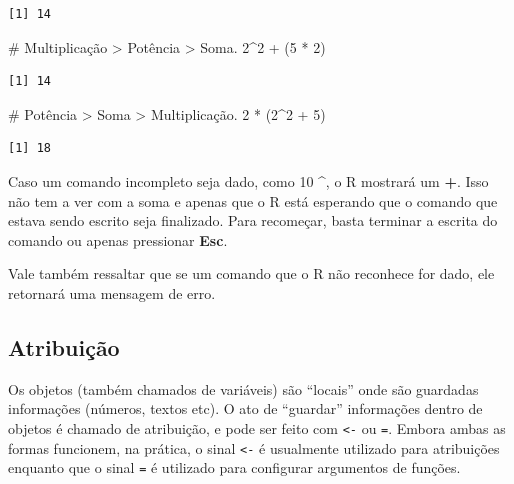 \documentclass[
  letterpaper,
  DIV=11,
  numbers=noendperiod]{scrreprt}
\newenvironment{Shaded}{\begin{snugshade}}{\end{snugshade}}
\newcommand{\CommentTok}[1]{\textcolor[rgb]{0.37,0.37,0.37}{#1}}
\newcommand{\DecValTok}[1]{\textcolor[rgb]{0.68,0.00,0.00}{#1}}
\newcommand{\NormalTok}[1]{\textcolor[rgb]{0.00,0.23,0.31}{#1}}
\newcommand{\SpecialCharTok}[1]{\textcolor[rgb]{0.37,0.37,0.37}{#1}}
\begin{document}
\begin{verbatim}
[1] 14
\end{verbatim}

\begin{Shaded}
\begin{Highlighting}[]
\CommentTok{\# Multiplicação \textgreater{} Potência \textgreater{} Soma.}
\DecValTok{2}\SpecialCharTok{\^{}}\DecValTok{2} \SpecialCharTok{+}\NormalTok{ (}\DecValTok{5} \SpecialCharTok{*} \DecValTok{2}\NormalTok{)}
\end{Highlighting}
\end{Shaded}

\begin{verbatim}
[1] 14
\end{verbatim}

\begin{Shaded}
\begin{Highlighting}[]
\CommentTok{\# Potência \textgreater{} Soma \textgreater{} Multiplicação.}
\DecValTok{2} \SpecialCharTok{*}\NormalTok{ (}\DecValTok{2}\SpecialCharTok{\^{}}\DecValTok{2} \SpecialCharTok{+} \DecValTok{5}\NormalTok{) }
\end{Highlighting}
\end{Shaded}

\begin{verbatim}
[1] 18
\end{verbatim}

Caso um comando incompleto seja dado, como 10 \^{}, o R mostrará um
\textbf{+}. Isso não tem a ver com a soma e apenas que o R está
esperando que o comando que estava sendo escrito seja finalizado. Para
recomeçar, basta terminar a escrita do comando ou apenas pressionar
\textbf{Esc}.

Vale também ressaltar que se um comando que o R não reconhece for dado,
ele retornará uma mensagem de erro.

\hypertarget{atribuiuxe7uxe3o}{%
\subsection{Atribuição}\label{atribuiuxe7uxe3o}}

Os objetos (também chamados de variáveis) são ``locais'' onde são
guardadas informações (números, textos etc). O ato de ``guardar''
informações dentro de objetos é chamado de atribuição, e pode ser feito
com \texttt{\textless{}-} ou \texttt{=}. Embora ambas as formas
funcionem, na prática, o sinal \texttt{\textless{}-} é usualmente
utilizado para atribuições enquanto que o sinal \texttt{=} é utilizado
para configurar argumentos de funções.
\end{document}
